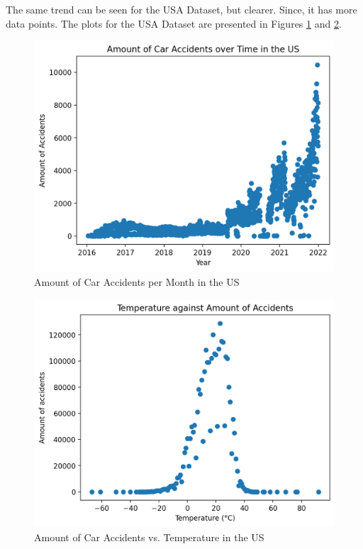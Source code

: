 \documentclass{article}
\begin{document}
The same trend can be seen for the USA Dataset, but clearer. Since, it has more data points. The plots for the USA Dataset are presented in Figures \ref{fig:usa_accidents_over_time} and \ref{fig:usa_accidents_vs_temp}.

\begin{figure}[h!]
    \centering
    \includegraphics[scale=0.5]{../figures/highres/usa_accidents_over_time.png}
    \caption{Amount of Car Accidents per Month in the US}
    \label{fig:usa_accidents_over_time}
\end{figure}


\begin{figure}[h!]
    \centering
    \includegraphics[scale=0.5]{../figures/highres/usa_temp_against_accidents.png}
    \caption{Amount of Car Accidents vs. Temperature in the US}
    \label{fig:usa_accidents_vs_temp}
\end{figure}
\end{document}

